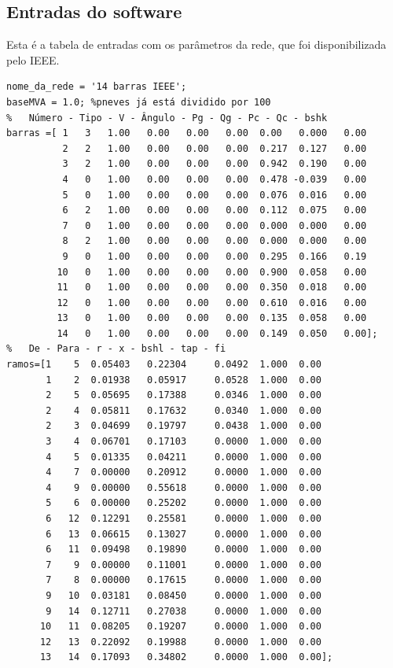 \subsection{Entradas do software}
Esta é a tabela de entradas com os parâmetros da rede, que foi disponibilizada pelo IEEE.
\begin{verbatim}
nome_da_rede = '14 barras IEEE';
baseMVA = 1.0; %pneves já está dividido por 100
%	Número - Tipo - V - Ângulo - Pg - Qg - Pc - Qc - bshk
barras =[ 1   3   1.00   0.00   0.00   0.00  0.00   0.000   0.00
          2   2   1.00   0.00   0.00   0.00  0.217  0.127   0.00
          3   2   1.00   0.00   0.00   0.00  0.942  0.190   0.00
          4   0   1.00   0.00   0.00   0.00  0.478 -0.039   0.00
          5   0   1.00   0.00   0.00   0.00  0.076  0.016   0.00
          6   2   1.00   0.00   0.00   0.00  0.112  0.075   0.00
          7   0   1.00   0.00   0.00   0.00  0.000  0.000   0.00
          8   2   1.00   0.00   0.00   0.00  0.000  0.000   0.00
          9   0   1.00   0.00   0.00   0.00  0.295  0.166   0.19
         10   0   1.00   0.00   0.00   0.00  0.900  0.058   0.00
         11   0   1.00   0.00   0.00   0.00  0.350  0.018   0.00
         12   0   1.00   0.00   0.00   0.00  0.610  0.016   0.00
         13   0   1.00   0.00   0.00   0.00  0.135  0.058   0.00
         14   0   1.00   0.00   0.00   0.00  0.149  0.050   0.00];
%	De - Para - r - x - bshl - tap - fi
ramos=[1    5  0.05403   0.22304     0.0492  1.000  0.00
       1    2  0.01938   0.05917     0.0528  1.000  0.00 
       2    5  0.05695   0.17388     0.0346  1.000  0.00
       2    4  0.05811   0.17632     0.0340  1.000  0.00
       2    3  0.04699   0.19797     0.0438  1.000  0.00
       3    4  0.06701   0.17103     0.0000  1.000  0.00
       4    5  0.01335   0.04211     0.0000  1.000  0.00
       4    7  0.00000   0.20912     0.0000  1.000  0.00
       4    9  0.00000   0.55618     0.0000  1.000  0.00
       5    6  0.00000   0.25202     0.0000  1.000  0.00
       6   12  0.12291   0.25581     0.0000  1.000  0.00
       6   13  0.06615   0.13027     0.0000  1.000  0.00
       6   11  0.09498   0.19890     0.0000  1.000  0.00
       7    9  0.00000   0.11001     0.0000  1.000  0.00
       7    8  0.00000   0.17615     0.0000  1.000  0.00
       9   10  0.03181   0.08450     0.0000  1.000  0.00
       9   14  0.12711   0.27038     0.0000  1.000  0.00
      10   11  0.08205   0.19207     0.0000  1.000  0.00
      12   13  0.22092   0.19988     0.0000  1.000  0.00
      13   14  0.17093   0.34802     0.0000  1.000  0.00];
\end{verbatim}

